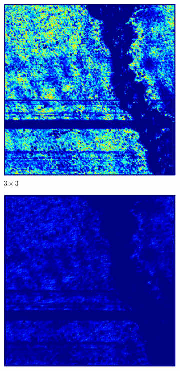 \documentclass[../main.tex]{subfiles}
\begin{document}
\begin{figure}[ht]
	\centering
	\begin{subfigure}{0.32\linewidth}
		\includegraphics[keepaspectratio, width=\linewidth]{images/nlm_weights_3.png}
		\caption{$3\times3$}
	\end{subfigure}
	\begin{subfigure}{0.32\linewidth}
		\includegraphics[keepaspectratio, width=\linewidth]{images/nlm_weights_5.png}

\end{subfigure}
\end{figure}
\end{document}
